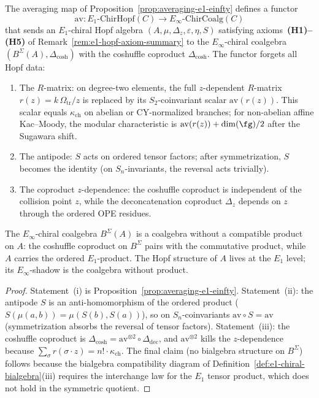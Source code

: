 \begin{proposition}
\label{prop:averaging-forgets-hopf}
The averaging map of
Proposition~\ref{prop:averaging-e1-einfty} defines a functor
\[
 \mathrm{av} \colon
 E_1\text{-}\mathrm{ChirHopf}(C) \longrightarrow
 E_\infty\text{-}\mathrm{ChirCoalg}(C)
\]
that sends an $E_1$-chiral Hopf algebra
$(A, \mu, \Delta_z, \varepsilon, \eta, S)$ satisfying
axioms~\textup{\textbf{(H1)--(H5)}} of
Remark~\textup{\ref{rem:e1-hopf-axiom-summary}} to the
$E_\infty$-chiral coalgebra
$(B^{\Sigma}(A), \Delta_{\mathrm{cosh}})$ with the coshuffle coproduct
$\Delta_{\mathrm{cosh}}$. The functor forgets all Hopf data:
\begin{enumerate}[label=(\roman*)]
\item The $R$-matrix: on degree-two elements, the full
 $z$-dependent $R$-matrix $r(z) = k\,\Omega_{\mathrm{tr}}/z$ is replaced by its
 $S_2$-coinvariant scalar $\mathrm{av}(r(z))$. This scalar equals
 $\kappa_{\mathrm{ch}}$ on abelian or CY-normalized branches; for
 non-abelian affine Kac--Moody, the modular characteristic is
 $\mathrm{av}(r(z))+\dim(\fg)/2$ after the Sugawara shift.
 \item The antipode: $S$ acts on ordered tensor factors; after
 symmetrization, $S$ becomes the identity (on $S_n$-invariants,
 the reversal acts trivially).
 \item The coproduct $z$-dependence: the coshuffle coproduct is
 independent of the collision point $z$, while the deconcatenation
 coproduct $\Delta_z$ depends on $z$ through the ordered OPE residues.
\end{enumerate}
The $E_\infty$-chiral coalgebra $B^{\Sigma}(A)$ is a coalgebra without
a compatible product on $A$: the coshuffle coproduct on $B^{\Sigma}$
pairs with the commutative product, while $A$ carries the ordered
$E_1$-product. The Hopf structure of $A$ lives at the $E_1$ level; its
$E_\infty$-shadow is the coalgebra without product.
\end{proposition}

\begin{proof}
Statement~(i) is Proposition~\ref{prop:averaging-e1-einfty}.
Statement~(ii): the antipode $S$ is an anti-homomorphism of the ordered
product ($S(\mu(a,b)) = \mu(S(b), S(a))$), so on $S_n$-coinvariants
$\mathrm{av} \circ S = \mathrm{av}$ (symmetrization absorbs the
reversal of tensor factors). Statement~(iii): the coshuffle coproduct is
$\Delta_{\mathrm{cosh}} = \mathrm{av}^{\otimes 2} \circ \Delta_{\mathrm{dec}}$,
and $\mathrm{av}^{\otimes 2}$ kills the $z$-dependence because
$\sum_{\sigma} r(\sigma \cdot z) = n! \cdot \kappa_{\mathrm{ch}}$.
The final claim (no bialgebra structure on $B^{\Sigma}$) follows because
the bialgebra compatibility diagram of
Definition~\ref{def:e1-chiral-bialgebra}(iii) requires the interchange
law for the $E_1$ tensor product, which does not hold in the symmetric
quotient.
\end{proof}

